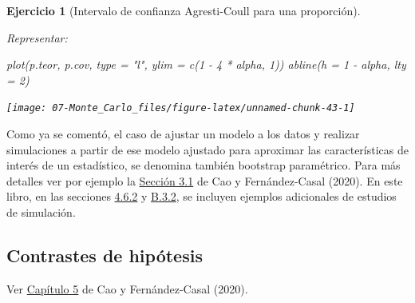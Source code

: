 \documentclass[
  10pt,
]{book}
\newenvironment{Shaded}{\begin{snugshade}}{\end{snugshade}}
\newcommand{\AttributeTok}[1]{\textcolor[rgb]{0.77,0.63,0.00}{#1}}
\newcommand{\DecValTok}[1]{\textcolor[rgb]{0.00,0.00,0.81}{#1}}
\newcommand{\FunctionTok}[1]{\textcolor[rgb]{0.00,0.00,0.00}{#1}}
\newcommand{\NormalTok}[1]{#1}
\newcommand{\SpecialCharTok}[1]{\textcolor[rgb]{0.00,0.00,0.00}{#1}}
\newcommand{\StringTok}[1]{\textcolor[rgb]{0.31,0.60,0.02}{#1}}
\theoremstyle{break}
\newtheorem{exercise}{Ejercicio}[chapter]
\theoremstyle{nonumberplain}
\begin{document}
\begin{exercise}[Intervalo de confianza Agresti-Coull para una proporción]
\begin{enumerate}
  Representar:

\begin{Shaded}
\begin{Highlighting}[]
\FunctionTok{plot}\NormalTok{(p.teor, p.cov, }\AttributeTok{type =} \StringTok{"l"}\NormalTok{, }\AttributeTok{ylim =} \FunctionTok{c}\NormalTok{(}\DecValTok{1} \SpecialCharTok{{-}} \DecValTok{4} \SpecialCharTok{*}\NormalTok{ alpha, }\DecValTok{1}\NormalTok{))}
\FunctionTok{abline}\NormalTok{(}\AttributeTok{h =} \DecValTok{1} \SpecialCharTok{{-}}\NormalTok{ alpha, }\AttributeTok{lty =} \DecValTok{2}\NormalTok{) }
\end{Highlighting}
\end{Shaded}

  \begin{center}\texttt{[image: 07-Monte\_Carlo\_files/figure-latex/unnamed-chunk-43-1]} \end{center}
\end{enumerate}

\end{exercise}

Como ya se comentó, el caso de ajustar un modelo a los datos y realizar simulaciones a partir de ese modelo ajustado para aproximar las características de interés de un estadístico, se denomina también bootstrap paramétrico.
Para más detalles ver por ejemplo la \href{https://rubenfcasal.github.io/book_remuestreo/modunif-boot-par.html}{Sección 3.1} de Cao y Fernández-Casal (2020).
En este libro, en las secciones \href{https://rubenfcasal.github.io/book_remuestreo/icboot-ejem.html\#estudio-sim-exp}{4.6.2} y \href{https://rubenfcasal.github.io/book_remuestreo/ejemplos-3.html\#estudio-sim-boot}{B.3.2}, se incluyen ejemplos adicionales de estudios de simulación.

\hypertarget{contrastes}{%
\subsection{Contrastes de hipótesis}\label{contrastes}}

Ver \href{https://rubenfcasal.github.io/book_remuestreo/contrastes.html}{Capítulo 5} de Cao y Fernández-Casal (2020).
\end{document}
